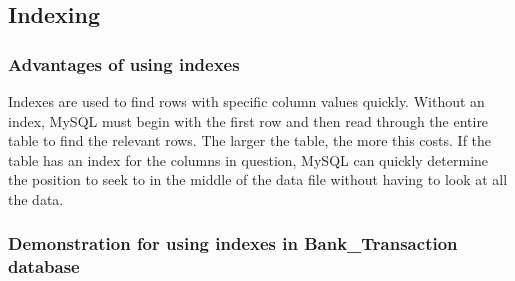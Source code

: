 \documentclass[12pt,a4paper]{article}
\begin{document}
\subsection{Indexing}
\subsubsection{Advantages of using indexes}
\indent Indexes are used to find rows with specific column values quickly. Without an index, MySQL must begin with the first row and then read through the entire table to find the relevant rows. The larger the table, the more this costs. If the table has an index for the columns in question, MySQL can quickly determine the position to seek to in the middle of the data file without having to look at all the data.
\subsubsection{Demonstration for using indexes in Bank\_Transaction database}
\end{document}
